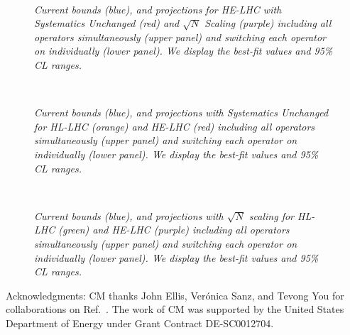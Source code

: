 \documentclass[../report.tex]{subfiles}
\providecommand{\main}{..}
\begin{document}
\begin{figure}[h]
  \centering
    \\
 \caption{\it Current bounds (blue), and projections for HE-LHC with Systematics Unchanged (red) and $\sqrt{N}$ Scaling (purple) including all operators simultaneously (upper panel) and switching each operator on individually (lower panel). We display the best-fit values and 95\% CL ranges.}
   \label{fig8:comp34}
\end{figure} 

\begin{figure}[h]
  \centering
    \\
 \caption{\it Current bounds (blue), and projections with Systematics Unchanged for HL-LHC (orange) and HE-LHC (red) including all operators simultaneously (upper panel) and switching each operator on individually (lower panel). We display the best-fit values and 95\% CL ranges.}
   \label{fig8:comp56}
\end{figure} 

\begin{figure}[h]
  \centering
    \\
 \caption{\it Current bounds (blue), and projections with $\sqrt{N}$ scaling for HL-LHC (green) and HE-LHC (purple) including all operators simultaneously (upper panel) and switching each operator on individually (lower panel). We display the best-fit values and 95\% CL ranges.}
   \label{fig8:comp78}
\end{figure}

Acknowledgments: 
CM thanks John Ellis, Ver\'{o}nica Sanz, and Tevong You for collaborations on Ref.~\cite{Ellis:2018gqa}.
The work of CM was supported by the United States Department of Energy under Grant Contract DE-SC0012704.
\end{document}
